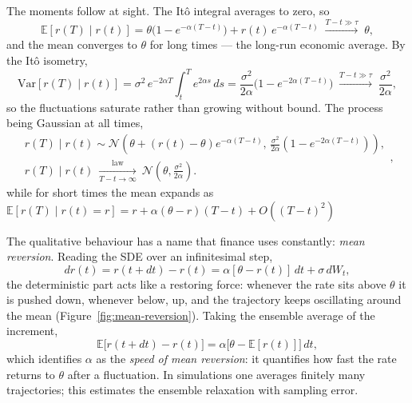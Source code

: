The moments follow at sight.
The It\^o integral averages to zero, so
\begin{equation}
\mathbb{E}[r(T)\mid r(t)] = \theta\bigl(1 - e^{-\alpha(T-t)}\bigr) + r(t)\, e^{-\alpha(T-t)} \;\xrightarrow{T-t \gg \tau}\; \theta,
\end{equation}
and the mean converges to $\theta$ for long times --- the long-run economic average.
By the It\^o isometry,
\begin{equation}
\mathrm{Var}[r(T)\mid r(t)] = \sigma^2\, e^{-2\alpha T}\int_t^T e^{2\alpha s}\, ds = \frac{\sigma^2}{2\alpha}\bigl(1 - e^{-2\alpha(T-t)}\bigr) \;\xrightarrow{T-t \gg \tau}\; \frac{\sigma^2}{2\alpha},
\end{equation}
so the fluctuations saturate rather than growing without bound.
The process being Gaussian at all times,
\begin{equation}
\begin{gathered}
r(T)\mid r(t)\sim\mathcal N\!\left(\theta+(r(t)-\theta)e^{-\alpha(T-t)},\,
\frac{\sigma^2}{2\alpha}(1-e^{-2\alpha(T-t)})\right),\\
r(T)\mid r(t)\ \xrightarrow[T-t\to\infty]{\mathrm{law}}\
\mathcal N\!\left(\theta,\frac{\sigma^2}{2\alpha}\right).
\end{gathered},
\end{equation}
while for short times the mean expands as $\mathbb{E}[r(T)\mid r(t)=r] = r + \alpha(\theta-r)(T-t) + O((T-t)^2)$

The qualitative behaviour has a name that finance uses constantly: \emph{mean reversion}.
Reading the SDE over an infinitesimal step,
\begin{equation}
dr(t) = r(t+dt) - r(t) = \alpha[\theta - r(t)]\,dt + \sigma\,dW_t,
\end{equation}
the deterministic part acts like a restoring force: whenever the rate sits above $\theta$ it is pushed down, whenever below, up, and the trajectory keeps oscillating around the mean (Figure~\ref{fig:mean-reversion}).
Taking the ensemble average of the increment,
\begin{equation}
\mathbb{E}\bigl[r(t+dt) - r(t)\bigr] = \alpha\bigl[\theta - \mathbb{E}[r(t)]\bigr]\, dt,
\end{equation}
which identifies $\alpha$ as the \emph{speed of mean reversion}: it quantifies how fast the rate returns to $\theta$ after a fluctuation.
In simulations one averages finitely many trajectories; this estimates the ensemble relaxation with sampling error.

